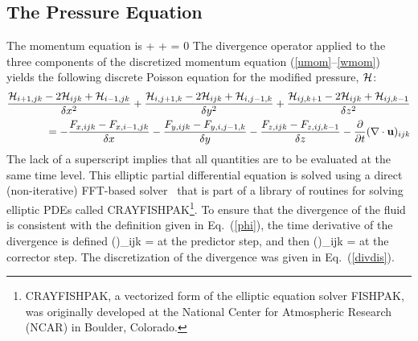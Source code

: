 \documentclass[11pt]{book}
\begin{document}
\clearpage
\subsection{The Pressure Equation}

The momentum equation is
\be {} + \bF + \nabla \cH = 0 \ee
The divergence operator applied to the three components of the
discretized momentum equation (\ref{umom}--\ref{wmom}) yields the following discrete Poisson equation for the modified pressure, ${\cal H}$:
\begin{eqnarray}
\frac{{\cal H}_{i+1,jk}-2{\cal H}_{ijk}+{\cal H}_{i-1,jk}}{\delta x^2} +
\frac{{\cal H}_{i,j+1,k}-2{\cal H}_{ijk}+{\cal H}_{i,j-1,k}}{\delta y^2} +
\frac{{\cal H}_{ij,k+1}-2{\cal H}_{ijk}+{\cal H}_{ij,k-1}}{\delta z^2} \nonumber \\ =
    -\frac{F_{x,ijk} - F_{x,i-1,jk}}{\delta x}
    -\frac{F_{y,ijk} - F_{y,i,j-1,k}}{\delta y}
    -\frac{F_{z,ijk} - F_{z,ij,k-1}}{\delta z} - \frac{\partial  }{\partial t}(\nabla \cdot {\bf u})_{ijk}
\end{eqnarray}
The lack of a superscript implies that all quantities are to be
evaluated at the same time level.
This elliptic partial differential equation is solved using a direct
(non-iterative) FFT-based solver~\cite{Sweet:1} that is part of a library of routines
for solving elliptic PDEs called CRAYFISHPAK\footnote{CRAYFISHPAK, a vectorized form of the
elliptic equation solver FISHPAK, was originally developed at the National Center for Atmospheric
Research (NCAR) in Boulder, Colorado.}.
To ensure that the divergence of the fluid is consistent with the definition
given in Eq.~(\ref{phi}), the time derivative of the divergence is defined
\be {}(\nabla \cdot \bu)_{ijk} =
           \ee
at the predictor step, and then
\be {}(\nabla \cdot \bu)_{ijk} =
          \ee
at the corrector step. The discretization of the divergence was
given in Eq.~(\ref{divdis}).
\end{document}
